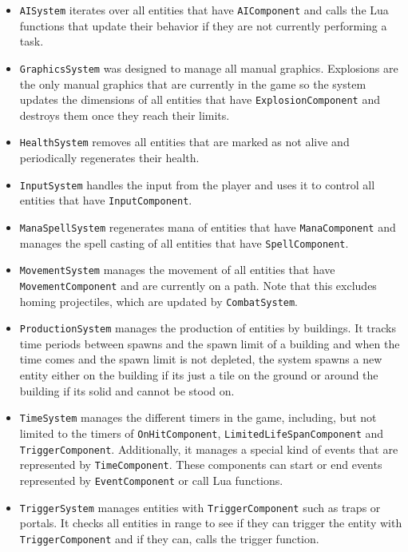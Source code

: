 \begin{itemize}
    \item \texttt{AISystem} iterates over all entities that have \texttt{AIComponent} and calls the Lua functions that update
        their behavior if they are not currently performing a task.
    \item \texttt{GraphicsSystem} was designed to manage all manual graphics. Explosions are the only manual graphics that are
        currently in the game so the system updates the dimensions of all entities that have \texttt{ExplosionComponent} and destroys
        them once they reach their limits.
    \item \texttt{HealthSystem} removes all entities that are marked as not alive and periodically regenerates their health.
    \item \texttt{InputSystem} handles the input from the player and uses it to control all entities that have \texttt{InputComponent}.
    \item \texttt{ManaSpellSystem} regenerates mana of entities that have \texttt{ManaComponent} and manages the spell casting of
        all entities that have \texttt{SpellComponent}.
    \item \texttt{MovementSystem} manages the movement of all entities that have \\ \texttt{MovementComponent} and are currently on a path.
        Note that this excludes homing projectiles, which are updated by \texttt{CombatSystem}.
    \item \texttt{ProductionSystem} manages the production of entities by buildings. It tracks time periods between spawns and the spawn
        limit of a building and when the time comes and the spawn limit is not depleted, the system spawns a new entity
        either on the building if its just a tile on the ground or around the building if its solid and cannot be stood on.
    \item \texttt{TimeSystem} manages the different timers in the game, including, but not limited to the timers of \texttt{OnHitComponent},
        \texttt{LimitedLifeSpanComponent} and \texttt{TriggerComponent}. Additionally, it manages a special kind of events that are
        represented by \texttt{TimeComponent}. These components can start or end events represented by \texttt{EventComponent} or
        call Lua functions.
    \item \texttt{TriggerSystem} manages entities with \texttt{TriggerComponent} such as traps or portals. It checks all entities in
        range to see if they can trigger the entity with \texttt{TriggerComponent} and if they can, calls the trigger function.
\end{itemize}

